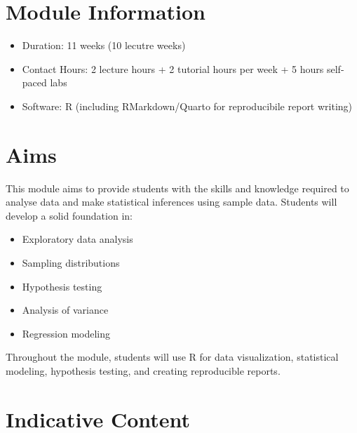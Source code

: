 \documentclass[
  a4paper,
  DIV=11,
  numbers=noendperiod,
  oneside]{scrreprt}
\providecommand{\tightlist}{%
  \setlength{\itemsep}{0pt}\setlength{\parskip}{0pt}}
\theoremstyle{definition}
\theoremstyle{definition}
\theoremstyle{plain}
\theoremstyle{plain}
\theoremstyle{definition}
\theoremstyle{remark}
\begin{document}
\section*{Module Information}\label{module-information}


\begin{itemize}
\tightlist
\item
  Duration: 11 weeks (10 lecutre weeks)
\item
  Contact Hours: 2 lecture hours + 2 tutorial hours per week + 5 hours
  self-paced labs
\item
  Software: R (including RMarkdown/Quarto for reproducibile report
  writing)
\end{itemize}

\section*{Aims}\label{aims}


This module aims to provide students with the skills and knowledge
required to analyse data and make statistical inferences using sample
data. Students will develop a solid foundation in:

\begin{itemize}
\tightlist
\item
  Exploratory data analysis\\
\item
  Sampling distributions\\
\item
  Hypothesis testing\\
\item
  Analysis of variance\\
\item
  Regression modeling
\end{itemize}

Throughout the module, students will use R for data visualization,
statistical modeling, hypothesis testing, and creating reproducible
reports.

\section*{Indicative Content}\label{indicative-content}
\end{document}
